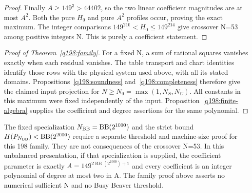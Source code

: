 \begin{proof}
Finally $A\ge149^3>44402$, so the two linear coefficient magnitudes
are at most $A^2$. Both the pure $H_0$ and pure $A^2$ profiles
occur, proving the exact maximum. The integer comparisons
$149^{210}<H_0\le149^{214}$ give crossover N=53 among positive
integers N. This is purely a coefficient statement.
\end{proof}

\begin{proof}[Proof of Theorem~\ref{q198:family}]
For a fixed N, a sum of rational squares vanishes exactly when each
residual vanishes. The table transport and chart identities identify
those rows with the physical system used above, with all its stated
domains. Propositions~\ref{q198:soundness} and~\ref{q198:completeness}
therefore give the claimed input projection for
$N\ge N_0=\max(1,N_S,N_C)$. All constants in this maximum were
fixed independently of the input. Proposition~\ref{q198:finite-algebra}
supplies the coefficient and degree assertions for the same polynomial.
\end{proof}

\begin{remark}\label{q198:bb-interface}
The fixed specialization
$N_{\rm BB}=\operatorname{BB}(2^{1000})$ and the strict bound
$H(P_{N_{\rm BB}})<\operatorname{BB}(2^{2000})$ require a separate
threshold and machine-size proof for this 198 family.
They are not consequences of the crossover N=53.
In this unbalanced presentation, if that specialization is supplied,
the coefficient parameter is exactly
$A=149^{2\operatorname{BB}(2^{1000})+1}$ and every coefficient is
an integer polynomial of degree at most two in A. The family proof
above asserts no numerical sufficient N and no Busy Beaver threshold.
\end{remark}
